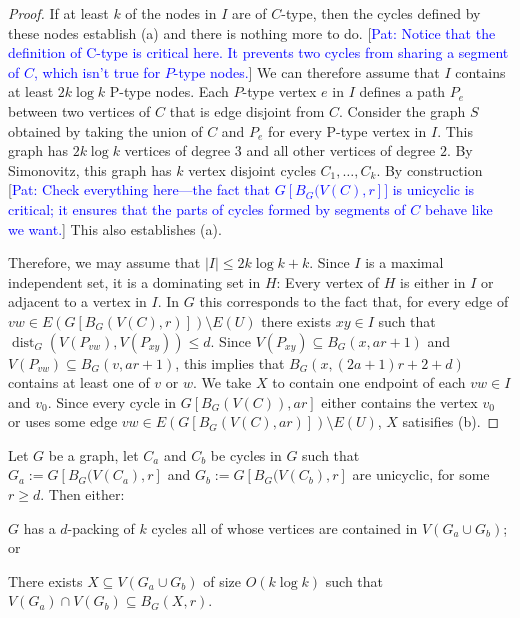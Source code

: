 \documentclass{patmorin}
\newcommand{\pat}[1]{\textcolor{Blue}{Pat: #1}}
\DeclareMathOperator{\dist}{dist}
\begin{document}
\begin{proof}
  If at least $k$ of the nodes in $I$ are of $C$-type, then the cycles defined by these nodes establish (a) and there is nothing more to do. [\pat{Notice that the definition of C-type is critical here. It prevents two cycles from sharing a segment of $C$, which isn't true for $P$-type nodes.}]  We can therefore assume that $I$ contains at least $2k\log k$ P-type nodes.  Each $P$-type vertex $e$ in $I$ defines a path $P_e$ between two vertices of $C$ that is edge disjoint from $C$.  Consider the graph $S$ obtained by taking the union of $C$ and $P_e$ for every P-type vertex in $I$.  This graph has $2k\log k$ vertices of degree $3$ and all other vertices of degree $2$.  By Simonovitz, this graph has $k$ vertex disjoint cycles $C_1,\ldots,C_k$.  By construction [\pat{Check everything here---the fact that $G[B_G(V(C),r]]$ is unicyclic is critical; it ensures that the parts of cycles formed by segments of $C$ behave like we want.}]  This also establishes (a).

  Therefore, we may assume that $|I|\le 2k\log k+k$.  Since $I$ is a maximal independent set, it is a dominating set in $H$: Every vertex of $H$ is either in $I$ or adjacent to a vertex in $I$.  In $G$ this corresponds to the fact that, for every edge of $vw\in E(G[B_G(V(C),r)])\setminus E(U)$ there exists $xy\in I$ such that $\dist_G(V(P_{vw}),V(P_{xy}))\le d$.  Since $V(P_{xy})\subseteq B_G(x,ar+1)$ and $V(P_{vw})\subseteq B_G(v,ar+1)$, this implies that $B_G(x,(2a+1)r+2+d)$ contains at least one of $v$ or $w$.  We take $X$ to contain one endpoint of each $vw\in I$ and $v_0$.  Since every cycle in $G[B_G(V(C)),ar]$ either contains the vertex $v_0$ or uses some edge $vw\in E(G[B_G(V(C),ar)])\setminus E(U)$, $X$ satisifies (b).
\end{proof}

\begin{lem}\label{double_unicycle}
  Let $G$ be a graph, let $C_a$ and $C_b$ be cycles in $G$ such that $G_a:=G[B_G(V(C_a),r]$ and $G_b:=G[B_G(V(C_b),r]$ are unicyclic, for some $r\ge d$.  Then either:
  \begin{compactenum}[(a)]
    \item $G$ has a $d$-packing of $k$ cycles all of whose vertices are contained in $V(G_a\cup G_b)$; or
    \item There exists $X\subseteq V(G_a\cup G_b)$ of size $O(k\log k)$ such that $V(G_a)\cap V(G_b)\subseteq B_G(X,r)$.
  \end{compactenum}
\end{lem}
\end{document}

